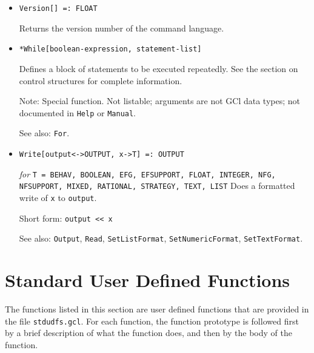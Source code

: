 \begin{itemize}

\item{}
\protect \large \begin{verbatim}
Version[] =: FLOAT
\end{verbatim} \normalsize

\bd
Returns the version number of the command language.
\ed


\item{} 
\protect \large \begin{verbatim}
*While[boolean-expression, statement-list]
\end{verbatim} \normalsize
  
\bd
Defines a block of statements to be executed repeatedly.
See the section on control structures for complete information.
\item [Note:] Special function.  Not listable; arguments are not GCl
data types; not documented in \verb+Help+ or \verb+Manual+.  
\item
[See also:] \verb+For+.
\ed

\item{}
\protect \large \begin{verbatim}
Write[output<->OUTPUT, x->T] =: OUTPUT  
\end{verbatim}\normalsize

{\it for} {\tt T = BEHAV, BOOLEAN, EFG, EFSUPPORT, FLOAT, INTEGER,
NFG, NFSUPPORT, MIXED, RATIONAL, STRATEGY, TEXT, LIST}
\bd
Does a formatted write of \verb+x+ to \verb+output+.
\item [Short form:] \verb+output << x+
\item [See also:] \verb+Output+, \verb+Read+, \verb+SetListFormat+,
\verb+SetNumericFormat+, \verb+SetTextFormat+.
\ed




\end{itemize}

\section{Standard User Defined Functions}
\renewcommand{\mysectionname}{\thesection\,\, USER DEFINED FUNCTIONS}

The functions listed in this section are user defined functions that
are provided in the file \verb+stdudfs.gcl+.  For each function, the
function prototype is followed first by a brief description of what
the function does, and then by the body of the function.  

